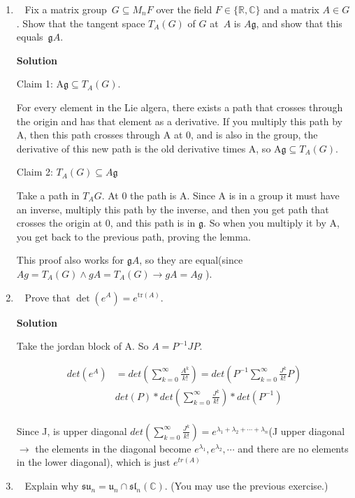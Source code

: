 \documentclass[11pt]{article}
\newcommand\score[1]{\marginpar{\vspace{-2ex}\color{blue}{#1/3}}\hspace{-1ex}}
\newcommand\0{\mathbf{0}}
\newcommand\CC{\mathbb{C}}
\newcommand\RR{\mathbb{R}}
\newcommand\<{\langle}
\renewcommand\>{\rangle}
\begin{document}
\begin{enumerate}
\item\ \score{}%
Fix a matrix group~$G\subseteq M_n F$ over the field $F\in\{\RR,\CC\}$
and a matrix $A \in G$.  Show that the tangent space $T_A(G)$ of $G$
at~$A$ is $A\mathfrak{g}$, and show that this equals~$\mathfrak{g}A$.

\textbf{Solution}

Claim 1: A$\mathfrak{g} \subseteq T_{A}(G)$.

For every element in the Lie algera, there exists a path that crosses through the origin and has that element 
as a derivative. If you multiply this path by A, then this path crosses through A at 0, and is also in the group, the derivative 
of this new path is the old derivative times A, so A$\mathfrak{g} \subseteq T_{A}(G)$.

Claim 2: $ T_{A}(G)\subseteq A\mathfrak{g} $

Take a path in $T_{A}{G}$. At 0 the path is A. Since A is in a group it must have an inverse, multiply this path by the inverse, and then you 
get path that crosses the origin at 0, and this path is in $\mathfrak{g}$. So when you multiply it by A, you get back to the previous path, proving the lemma.

This proof also works for $\mathfrak{g}A$, so they are equal(since $Ag = T_{A}({G}) \wedge gA = T_{A}({G}) \rightarrow gA = Ag$ ).

\item\ \score{}%
Prove that $\det(e^A) = e^{\mathrm{tr}(A)}$.

\textbf{Solution}

Take the jordan block of A. So $A=P^{-1}JP$.

\begin{align*}
  det(e^{A})&=det(\sum_{k=0}^{\infty}{\frac{A^{k}}{k!}})=det(P^{-1}\sum_{k=0}^{\infty}{\frac{J^{k}}{k!}}P)\\
            &det(P)*det(\sum_{k=0}^{\infty}{\frac{J^{k}}{k!}})*det(P^{-1})\\
\end{align*}

Since J, is upper diagonal $det(\sum_{k=0}^{\infty}{\frac{J^{k}}{k!}})=e^{\lambda_1 + \lambda_2 + \cdots + \lambda_n}$(J upper diagonal $\rightarrow$
the elements in the diagonal become $e^{\lambda_1},e^{\lambda_2}, \cdots $ and there are no elements in the lower diagonal), which is
just $e^{tr(A)}$

\item\ \score{}%
Explain why $\mathfrak{su}_n =\mathfrak{u}_n\cap\mathfrak{sl}_n(\CC)$.
(You may use the previous exercise.)


\end{enumerate}
\end{document}
